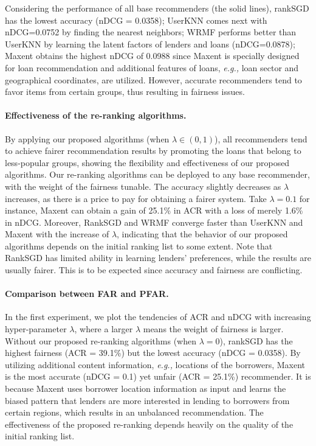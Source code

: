 Considering the performance of all base recommenders (the solid lines), rankSGD has the lowest accuracy (nDCG = 0.0358); UserKNN comes next with nDCG=0.0752 by finding the nearest neighbors; WRMF performs better than UserKNN by learning the latent factors of lenders and loans (nDCG=0.0878); Maxent obtains the highest nDCG of 0.0988 since Maxent is specially designed for loan recommendation and additional features of loans, \emph{e.g.,} loan sector and geographical coordinates, are utilized. However, accurate recommenders tend to favor items from certain groups, thus resulting in fairness issues.

\paragraph{Effectiveness of the re-ranking algorithms.} By applying our proposed algorithms (when $\lambda\in(0,1)$), all recommenders tend to achieve fairer recommendation results by promoting the loans that belong to less-popular groups, showing the flexibility and effectiveness of our proposed algorithms. Our re-ranking algorithms can be deployed to any base recommender, with the weight of the fairness tunable. The accuracy slightly decreases as $\lambda$ increases, as there is a price to pay for obtaining a fairer system. Take $\lambda=0.1$ for instance, Maxent can obtain a gain of 25.1\% in ACR with a loss of merely 1.6\% in nDCG. Moreover, RankSGD and WRMF converge faster than UserKNN and Maxent with the increase of $\lambda$, indicating that the behavior of our proposed algorithms depends on the initial ranking list to some extent. Note that RankSGD has limited ability in learning lenders' preferences, while the results are usually fairer. This is to be expected since accuracy and fairness are conflicting.

\paragraph{Comparison between FAR and PFAR.} In the first experiment, we plot the tendencies of ACR and nDCG with increasing hyper-parameter $\lambda$, where a larger $\lambda$ means the weight of fairness is larger. Without our proposed re-ranking algorithms (when $\lambda=0$), rankSGD has the highest fairness (ACR = 39.1\%) but the lowest accuracy (nDCG = 0.0358). By utilizing additional content information, \emph{e.g.,} locations of the borrowers, Maxent is the most accurate (nDCG = 0.1) yet unfair (ACR = 25.1\%) recommender. It is because Maxent uses borrower location information as input and learns the biased pattern that lenders are more interested in lending to borrowers from certain regions, which results in an unbalanced recommendation. The effectiveness of the proposed re-ranking depends heavily on the quality of the initial ranking list.

